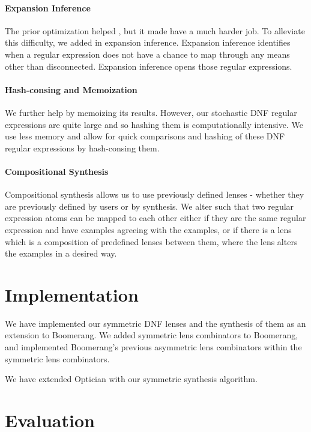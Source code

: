 \documentclass[acmsmall,screen,anonymous]{acmart}
\begin{document}
\paragraph*{Expansion Inference} The prior optimization helped \GreedySynth, but
it made \RXSearch have a much harder job.  To alleviate this difficulty, we
added in expansion inference.  Expansion inference identifies when a regular
expression does not have a chance to map through any means other than
disconnected.  Expansion inference opens those regular expressions.

\paragraph*{Hash-consing and Memoization} We further help \GreedySynth by
memoizing its results.  However, our stochastic DNF regular expressions are
quite large and so hashing them is computationally intensive.  We use less
memory and allow for quick comparisons and hashing of these DNF regular
expressions by hash-consing them.

\paragraph*{Compositional Synthesis} Compositional synthesis allows us to use
previously defined lenses - whether they are previously defined by users or by
synthesis. We alter \GreedySynth such that two regular expression atoms can be
mapped to each other either if they are the same regular expression and have
examples agreeing with the examples, or if there is a lens which is a
composition of predefined lenses between them, where the lens alters the
examples in a desired way.

\section{Implementation}
\label{sec:implementation}
We have implemented our symmetric DNF lenses and the synthesis of them as an
extension to Boomerang. We added symmetric lens combinators to Boomerang, and
implemented Boomerang's previous asymmetric lens combinators within the
symmetric lens combinators.

We have extended Optician with our symmetric synthesis algorithm.

\section{Evaluation}
\label{sec:evaluation}
\end{document}
